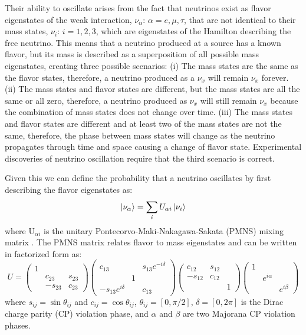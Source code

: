 Their ability to oscillate arises from the fact that neutrinos exist as flavor eigenstates of the weak interaction, $\nu_\alpha$: $\alpha = e, \mu, \tau$, that are not identical to their mass states, $\nu_i$: $i = 1, 2, 3$, which are eigenstates of the Hamilton describing the free neutrino.
This means that a neutrino produced at a source has a known flavor, but its mass is described as a superposition of all possible mass eigenstates, creating three possible scenarios:
(i) The mass states are the same as the flavor states, therefore, a neutrino produced as a $\nu_x$ will remain $\nu_x$ forever. 
(ii) The mass states and flavor states are different, but the mass states are all the same or all zero, therefore, a neutrino produced as $\nu_x$ will still remain $\nu_x$ because the combination of mass states does not change over time. 
(iii) The mass states and flavor states are different and at least two of the mass states are not the same, therefore, the phase between mass states will change as the neutrino propagates through time and space causing a change of flavor state.
Experimental discoveries of neutrino oscillation require that the third scenario is correct.

Given this we can define the probability that a neutrino oscillates by first describing the flavor eigenstates as:
\begin{equation}
	\ket{\nu_\alpha} = \sum_{i}U_{\alpha i}\ket{\nu_i}
\end{equation}
where U$_{\alpha i}$ is the unitary Pontecorvo-Maki-Nakagawa-Sakata (PMNS) mixing matrix \cite{PDG}. 
The PMNS matrix relates flavor to mass eigenstates and can be written in factorized form as:
\begin{equation}	
	U = 
	\begin{pmatrix}
		1 & & \\
		& c_{23} & s_{23} \\
		& -s_{23} & c_{23}
	\end{pmatrix}
	\begin{pmatrix}
		c_{13} & & s_{13}e^{-i\delta} \\
		& 1 &	\\
		-s_{13}e^{i\delta} & & c_{13}
	\end{pmatrix}
	\begin{pmatrix}
		c_{12} & s_{12} & \\
		-s_{12} & c_{12} & \\
		& & 1
	\end{pmatrix}
	\begin{pmatrix}
		1 & & \\
		& e^{i\alpha}  & \\
		& & e^{i\beta}
	\end{pmatrix}
\end{equation}
where $s_{ij} = \sin\theta_{ij}$ and $c_{ij} = \cos\theta_{ij}$, $\theta_{ij} = [0,\pi/2]$,
$\delta = [0,2\pi]$ is the Dirac charge parity (CP) violation phase, and $\alpha$ and $\beta$ are two Majorana CP violation phases.

